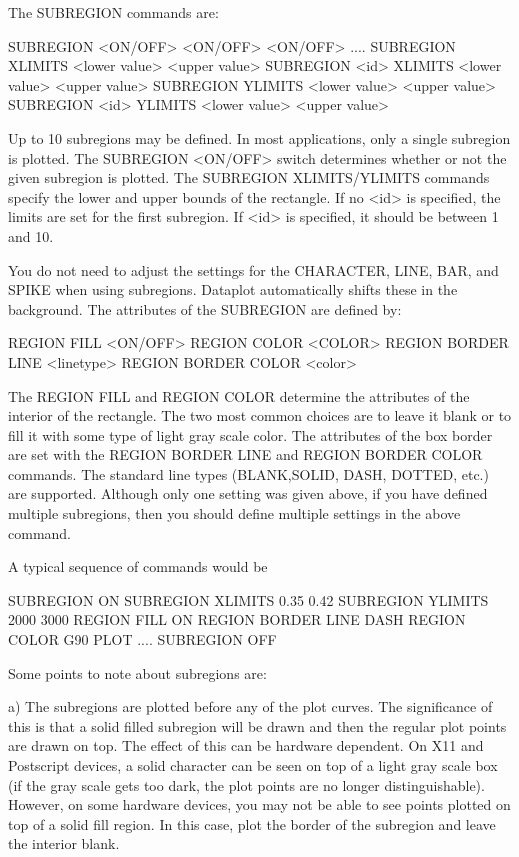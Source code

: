 {    The SUBREGION commands are:

        SUBREGION <ON/OFF> <ON/OFF> <ON/OFF> ....
        SUBREGION XLIMITS <lower value> <upper value>
        SUBREGION <id> XLIMITS <lower value> <upper value>
        SUBREGION YLIMITS <lower value> <upper value>
        SUBREGION <id> YLIMITS <lower value> <upper value>

    Up to 10 subregions may be defined.  In most applications,
    only a single subregion is plotted.  The SUBREGION <ON/OFF>
    switch determines whether or not the given subregion is
    plotted.  The SUBREGION XLIMITS/YLIMITS commands specify
    the lower and upper bounds of the rectangle.  If no
    <id> is specified, the limits are set for the first subregion.
    If <id> is specified, it should be between 1 and 10.

    You do not need to adjust the settings for the CHARACTER, LINE,
    BAR, and SPIKE when using subregions.  Dataplot automatically
    shifts these in the background.  The attributes of the SUBREGION
    are defined by:

        REGION FILL <ON/OFF>
        REGION COLOR <COLOR>
        REGION BORDER LINE <linetype>
        REGION BORDER COLOR <color>

    The REGION FILL and REGION COLOR determine the attributes of
    the interior of the rectangle.  The two most common choices
    are to leave it blank or to fill it with some type of light gray
    scale color.  The attributes of the box border are set with
    the REGION BORDER LINE and REGION BORDER COLOR commands.  The
    standard line types (BLANK,SOLID, DASH, DOTTED, etc.) are
    supported.  Although only one setting was given above, if you
    have defined multiple subregions, then you should define
    multiple settings in the above command.

    A typical sequence of commands would be

        SUBREGION ON
        SUBREGION XLIMITS 0.35 0.42
        SUBREGION YLIMITS 2000 3000
        REGION FILL ON
        REGION BORDER LINE DASH
        REGION COLOR G90
        PLOT ....
        SUBREGION OFF

    Some points to note about subregions are:

    a) The subregions are plotted before any of the plot
       curves.  The significance of this is that a solid filled
       subregion will be drawn and then the regular plot points
       are drawn on top.  The effect of this can be hardware
       dependent.  On X11 and Postscript devices, a solid character
       can be seen on top of a light gray scale box (if the gray
       scale gets too dark, the plot points are no longer
       distinguishable).  However, on some hardware devices, you may
       not be able to see points plotted on top of a solid fill
       region.  In this case, plot the border of the subregion and
       leave the interior blank.

}
